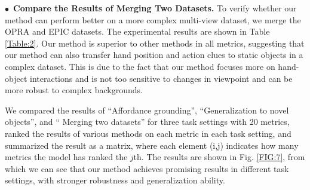 \documentclass[journal,twoside]{IEEEtran}
\newcommand{\myPara}[1]{\vspace{5pt}\noindent$\bullet$~\textbf{#1} \quad}
\begin{document}
\myPara{Compare the Results of Merging Two Datasets.}
To verify whether our method can perform better on a more complex multi-view dataset, we merge the OPRA \cite{demo2vec2018cvpr} and EPIC \cite{Damen2018EPICKITCHENS} datasets. The experimental results are shown in Table \ref{Table:2}. Our method is superior to other methods in all metrics, suggesting that our method can also transfer hand position and action clues to static objects in a complex dataset. This is due to the fact that our method focuses more on hand-object interactions and is not too sensitive to changes in viewpoint and can be more robust to complex backgrounds.

\par We compared the results of ``Affordance grounding'', ``Generalization to novel objects'', and `` Merging two datasets'' for three task settings with 20 metrics, ranked the results of various methods on each metric in each task setting, and summarized the result as a matrix, where each element (i,j) indicates how many metrics the model has ranked the $j$th. The results are shown in Fig. \ref{FIG:7}, from which we can see that our method achieves promising results in different task settings, with stronger robustness and generalization ability.
\end{document}
